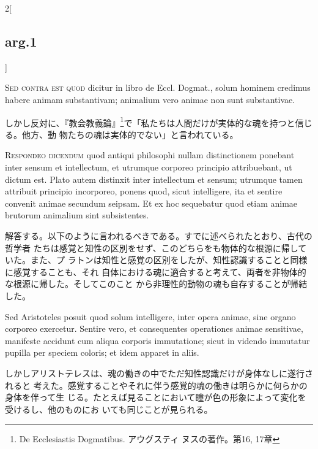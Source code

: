 \documentclass[paper=a4paper,fontsize=10pt,jafontsize=9pt,titlepage]{jlreq}
\begin{document}
\begin{paracol}{2}[\subsection{arg.1}]
\switchcolumn*[\subsection{s.c.}]

{\scshape Sed contra est quod} dicitur in libro de Eccl. Dogmat., solum hominem
credimus habere animam substantivam; animalium vero animae non sunt
substantivae.

\switchcolumn

 しかし反対に、『教会教義論』\footnote{De Ecclesiastis Dogmatibus. アウグスティ
 ヌスの著作。第16, 17章}で「私たちは人間だけが実体的な魂を持つと信じる。他方、動
 物たちの魂は実体的でない」と言われている。



 {\scshape Respondeo dicendum} quod antiqui philosophi nullam distinctionem
 ponebant inter sensum et intellectum, et utrumque corporeo principio
 attribuebant, ut dictum est. Plato autem distinxit inter intellectum et sensum;
 utrumque tamen attribuit principio incorporeo, ponens quod, sicut intelligere,
 ita et sentire convenit animae secundum seipsam. Et ex hoc sequebatur quod
 etiam animae brutorum animalium sint subsistentes.

\switchcolumn

 解答する。以下のように言われるべきである。すでに述べられたとおり、古代の哲学者
 たちは感覚と知性の区別をせず、このどちらをも物体的な根源に帰していた。また、プ
 ラトンは知性と感覚の区別をしたが、知性認識することと同様に感覚することも、それ
 自体における魂に適合すると考えて、両者を非物体的な根源に帰した。そしてこのこと
 から非理性的動物の魂も自存することが帰結した。

\switchcolumn*

 Sed Aristoteles posuit quod solum intelligere, inter opera animae, sine organo
 corporeo exercetur. Sentire vero, et consequentes operationes animae
 sensitivae, manifeste accidunt cum aliqua corporis immutatione; sicut in
 videndo immutatur pupilla per speciem coloris; et idem apparet in aliis.


\switchcolumn

 しかしアリストテレスは、魂の働きの中でただ知性認識だけが身体なしに遂行されると
 考えた。感覚することやそれに伴う感覚的魂の働きは明らかに何らかの身体を伴って生
 じる。たとえば見ることにおいて瞳が色の形象によって変化を受けるし、他のものにお
 いても同じことが見られる。


\end{paracol}
\end{document}
